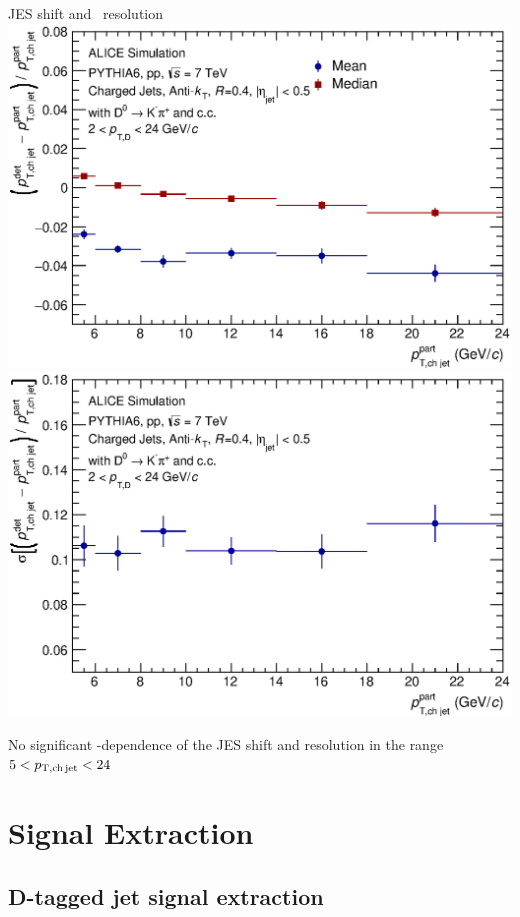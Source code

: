 \documentclass{beamer}
\begin{document}
\begin{frame}{JES shift and \pt\ resolution}
\smallskip
\centering
\includegraphics[width=.36\textwidth]{img/HQ16_Simulation_EnergyScaleShift}\quad
\includegraphics[width=.36\textwidth]{img/HQ16_Simulation_Resolution}

No significant \pt-dependence of the JES shift and resolution in the range $5<p_{\mathrm{T,ch\, jet}}<24$~\GeVc
\end{frame}

\section{Signal Extraction}

\subsection{D-tagged jet signal extraction}
\end{document}
